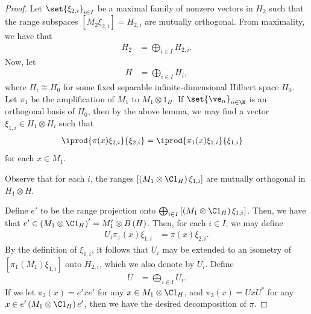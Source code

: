 \documentclass[10pt]{mypackage}
\begin{document}
\begin{proof}
  Let $\set{\xi_{2,i}}_{i\in I}$ be a maximal family of nonzero vectors in $H_2$ such that the range subspaces $\left[ M_2\xi_{2,i} \right] = H_{2,i}$ are mutually orthogonal. From maximality, we have that
  \begin{align*}
    H_2 &= \bigoplus_{i\in I}H_{2,i}.
  \end{align*}
  Now, let
  \begin{align*}
    H &= \bigoplus_{i\in I}H_i,
  \end{align*}
  where $H_i\cong H_0$ for some fixed separable infinite-dimensional Hilbert space $H_0$. Let $\pi_1$ be the amplification of $M_1$ to $M_1\otimes 1_{H}$. If $\set{\ve_n}_{n\in \N}$ is an orthogonal basis of $H_0$, then by the above lemma, we may find a vector $\xi_{1,i}\in H_1\otimes H_i$ such that
  \begin{align*}
    \iprod{\pi(x)\xi_{2,i}}{\xi_{2,i}} &= \iprod{\pi_1(x)\xi_{1,i}}{\xi_{1,i}}
  \end{align*}
  for each $x\in M_1$.

  Observe that for each $i$, the ranges $ \left[ \left( M_1\otimes \C 1_{H} \right)\xi_{1,i} \right] $ are mutually orthogonal in $H_1\otimes H$. 

  Define $e'$ to be the range projection onto $\bigoplus_{i\in I}\left[ \left( M_1\otimes \C 1_{H} \right)\xi_{1,i} \right]$. Then, we have that $e'\in \left( M_1\otimes \C1_{H} \right)' = M_1'\otimes B\left( H \right)$. Then, for each $i\in I$, we may define
  \begin{align*}
    U_i\pi_1\left( x \right)\xi_{1,i} &= \pi(x)\xi_{2,i}.
  \end{align*}
  By the definition of $\xi_{1,i}$, it follows that $U_i$ may be extended to an isometry of $\left[ \pi_1\left( M_1 \right)\xi_{1,i} \right]$ onto $H_{2,i}$, which we also denote by $U_i$. Define
  \begin{align*}
    U &= \bigoplus_{i\in I}U_i.
  \end{align*}
  If we let $\pi_2(x) = e'xe'$ for any $x\in M_1\otimes \C 1_{H}$, and $\pi_3(x) = UxU^{\ast}$ for any $x\in e'\left( M_1\otimes \C 1_{H} \right)e'$, then we have the desired decomposition of $\pi$.
\end{proof}
\end{document}

